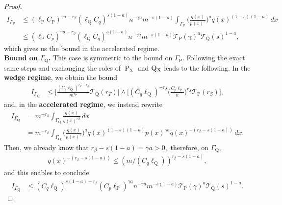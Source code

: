 \documentclass[10pt]{article}
\newcommand{\mT}{\mathcal{T}}
\renewcommand{\P}{\operatorname{P}}
\newcommand{\Q}{\operatorname{Q}}
\newcommand{\sX}{\mathrm{X}}
\begin{document}
\begin{proof}
    \begin{align*}
        I_{\Gamma_{\P}} &\leq (\ell_{\P}C_{\P})^{\gamma a - r_\beta}(\ell_{\Q}C_q)^{s(1 - a)}n^{-\gamma a}m^{-s(1 - a)}\int_{\Gamma_{\P}}\Big(\frac{q(x)}{p(x)^{\gamma}}\Big)^aq(x)^{(1 - s)(1 - a)}\, dx\\
        &\leq (\ell_{\P}C_{p})^{\gamma a - r_\beta}(\ell_{\Q}C_q)^{s(1 - a)}n^{-\gamma a}m^{-s(1 - a)}\mT_{\P}(\gamma)^{a}\mT_{\Q}(s)^{1-a},
    \end{align*}
    which gives us the bound in the accelerated regime.\\
    
    \noindent\textbf{Bound on $\Gamma_{\Q}$.} This case is symmetric to the bound on $\Gamma_{\P}.$ Following the exact same steps and exchanging the roles of $\P_{\sX}$ and $\Q\mathstrut_{\!\sX}$ leads to the following. In the \textbf{wedge regime}, we obtain the bound
    \begin{align*}
        I_{\Gamma_{\Q}} &\leq \bigg[\frac{(C_q\ell_{\Q})^{r_T - r_\beta}}{m^{r_T}}\mT_{\Q}(r_T)\bigg] \wedge \bigg[(C_q\ell_{\Q})^{-r_\beta}\Big(\frac{C_p\ell_{\P}}{n}\Big)^{r_S}\mT_{\P}(r_S)\bigg],
    \end{align*}
    and, in the \textbf{accelerated regime}, we instead rewrite
    \begin{align*}
        I_{\Gamma_{\Q}} &= m^{-r_\beta}\int_{\Gamma_{\Q}}\frac{q(x)}{q(x)^{r\beta}}\, dx\\
        &= m^{-r_\beta}\int_{\Gamma_{\Q}}\Big(\frac{q(x)}{p(x)^\gamma}\Big)^aq(x)^{(1 - s)(1 - a)}p(x)^{\gamma a}q(x)^{-(r_\beta - s(1 - a))}\, dx.
    \end{align*}
    Then, we already know that $r_\beta - s(1 - a) = \gamma a >0,$ therefore, on $\Gamma_{\Q},$
    \begin{align*}
    q(x)^{-(r_\beta - s(1 - a))} \leq (m/(C_q\ell_{\Q}))^{r_\beta - s(1 - a)},
    \end{align*}
    and this enables to conclude
    \begin{align*}
        I_{\Gamma_{\Q}} &\leq (C_q\ell_{\Q})^{s(1 - a) - r_\beta}(C_p\ell_{\P})^{\gamma a}n^{-\gamma a}m^{-s(1 - a)}\mT_{\P}(\gamma)^{a}\mT_{\Q}(s)^{1 - a}.
    \end{align*}
    

\end{proof}
\end{document}

